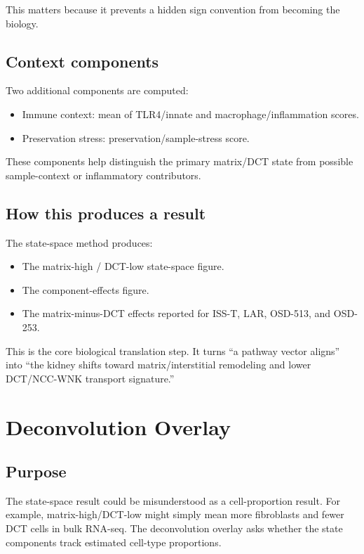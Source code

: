\documentclass[11pt]{article}
\begin{document}
This matters because it prevents a hidden sign convention from becoming the biology.

\subsection{Context components}

Two additional components are computed:

\begin{itemize}
  \item Immune context: mean of TLR4/innate and macrophage/inflammation scores.
  \item Preservation stress: preservation/sample-stress score.
\end{itemize}

These components help distinguish the primary matrix/DCT state from possible sample-context or inflammatory contributors.

\subsection{How this produces a result}

The state-space method produces:

\begin{itemize}
  \item The matrix-high / DCT-low state-space figure.
  \item The component-effects figure.
  \item The matrix-minus-DCT effects reported for ISS-T, LAR, OSD-513, and OSD-253.
\end{itemize}

This is the core biological translation step. It turns ``a pathway vector aligns'' into ``the kidney shifts toward matrix/interstitial remodeling and lower DCT/NCC-WNK transport signature.''

\section{Deconvolution Overlay}

\subsection{Purpose}

The state-space result could be misunderstood as a cell-proportion result. For example, matrix-high/DCT-low might simply mean more fibroblasts and fewer DCT cells in bulk RNA-seq. The deconvolution overlay asks whether the state components track estimated cell-type proportions.
\end{document}
